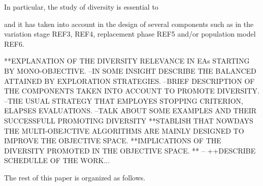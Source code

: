 %

In particular, the study of diversity is essential to 

and it has taken into account in the design of several components such as in the variation stage REF3, REF4, replacement phase REF5 and/or population model REF6.
%

%
**EXPLANATION OF THE DIVERSITY RELEVANCE IN EAs STARTING BY MONO-OBJECTIVE.
	--IN SOME INSIGHT DESCRIBE THE BALANCED ATTAINED BY EXPLORATION STRATEGIES.
	--BRIEF DESCRIPTION OF THE COMPONENTS TAKEN INTO ACCOUNT TO PROMOTE DIVERSITY.
	--THE USUAL STRATEGY THAT EMPLOYES STOPPING CRITERION, ELAPSES EVALUATIONS.
	--TALK ABOUT SOME EXAMPLES AND THEIR SUCCESSFULL PROMOTING DIVERSITY
**STABLISH THAT NOWDAYS THE MULTI-OBEJCTIVE ALGORITHMS ARE MAINLY DESIGNED TO IMPROVE THE OBJECTIVE SPACE.
**IMPLICATIONS OF THE DIVERSITY PROMOTED IN THE OBJECTIVE SPACE.
**
	--
++DESCRIBE SCHEDULLE OF THE WORK...


The rest of this paper is organized as follows.

